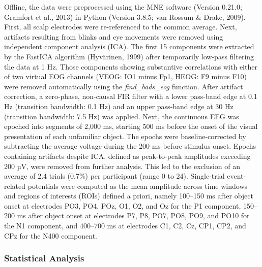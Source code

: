 \documentclass[
  english,
  man,11pt,floatsintext]{apa7}
\begin{document}
Offline, the data were preprocessed using the MNE software (Version 0.21.0; Gramfort et al., 2013) in Python (Version 3.8.5; van Rossum \& Drake, 2009). First, all scalp electrodes were re-referenced to the common average. Next, artifacts resulting from blinks and eye movements were removed using independent component analysis (ICA). The first 15 components were extracted by the FastICA algorithm (Hyvärinen, 1999) after temporarily low-pass filtering the data at 1 Hz. Those components showing substantive correlations with either of two virtual EOG channels (VEOG: IO1 minus Fp1, HEOG: F9 minus F10) were removed automatically using the \emph{find\_bads\_eog} function. After artifact correction, a zero-phase, non-causal FIR filter with a lower pass-band edge at 0.1 Hz (transition bandwidth: 0.1 Hz) and an upper pass-band edge at 30 Hz (transition bandwidth: 7.5 Hz) was applied. Next, the continuous EEG was epoched into segments of 2,000 ms, starting 500 ms before the onset of the visual presentation of each unfamiliar object. The epochs were baseline-corrected by subtracting the average voltage during the 200 ms before stimulus onset. Epochs containing artifacts despite ICA, defined as peak-to-peak amplitudes exceeding 200 µV, were removed from further analysis. This led to the exclusion of an average of 2.4 trials (0.7\%) per participant (range 0 to 24). Single-trial event-related potentials were computed as the mean amplitude across time windows and regions of interests (ROIs) defined a priori, namely 100--150 ms after object onset at electrodes PO3, PO4, POz, O1, O2, and Oz for the P1 component, 150--200 ms after object onset at electrodes P7, P8, PO7, PO8, PO9, and PO10 for the N1 component, and 400--700 ms at electrodes C1, C2, Cz, CP1, CP2, and CPz for the N400 component.

\hypertarget{statistical-analysis}{%
\subsubsection{Statistical Analysis}\label{statistical-analysis}}
\end{document}
